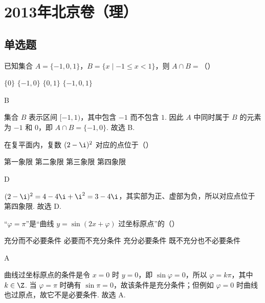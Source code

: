 \chapter{2013年北京卷（理）}

\section{单选题}

\begin{problem}
已知集合 \(A = \{-1, 0, 1\}\)，\(B = \{x \mid -1 \leqslant x < 1\}\)，则 \(A \cap B =\)（\quad）

\choices
    {\(\{0\}\)}
    {\( \{-1,0\} \)}
    {\(\{0,1\}\)}
    {\( \{-1, 0, 1\} \)}
\end{problem}

\begin{answer}
B
\end{answer}

\begin{solution}
集合 \(B\) 表示区间 \([-1,1)\)，其中包含 \(-1\) 而不包含 \(1\). 因此 \(A\) 中同时属于 \(B\) 的元素为 \(-1\) 和 \(0\)，即 \(A\cap B=\{-1,0\}\). 故选 B.
\end{solution}

\begin{problem}
在复平面内，复数 \((2 - \i)^2\) 对应的点位于（\quad）

\choices
    {第一象限}
    {第二象限}
    {第三象限}
    {第四象限}
\end{problem}

\begin{answer}
D
\end{answer}

\begin{solution}

\((2-\i)^2=4-4\i+\i^2=3-4\i\)，其实部为正、虚部为负，所以对应点位于第四象限. 故选 D.
\end{solution}

\begin{problem}
“\(\varphi = \pi\)”是“曲线 \(y = \sin (2x + \varphi)\) 过坐标原点”的（\quad）

\choices
    {充分而不必要条件}
    {必要而不充分条件}
    {充分必要条件}
    {既不充分也不必要条件}
\end{problem}

\begin{answer}
A
\end{answer}

\begin{solution}

曲线过坐标原点的条件是令 \(x=0\) 时 \(y=0\)，即 \(\sin\varphi=0\)，所以 \(\varphi=k\pi\)，其中 \(k\in\Z\). 当 \(\varphi=\pi\) 时确有 \(\sin\pi=0\)，故该条件是充分条件；但例如 \(\varphi=0\) 时曲线也过原点，故它不是必要条件. 故选 A.
\end{solution}

